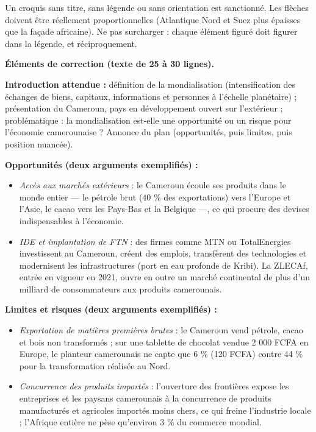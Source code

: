 \documentclass[11pt]{article}
\newcommand{\cle}[1]{{\popxbold\color{popdark}#1}}
\begin{document}
\begin{attention}
Un croquis sans titre, sans légende ou sans orientation est sanctionné. Les flèches doivent être réellement proportionnelles (Atlantique Nord et Suez plus épaisses que la façade africaine). Ne pas surcharger : chaque élément figuré doit figurer dans la légende, et réciproquement.
\end{attention}

\begin{corrige}
\textbf{Éléments de correction (texte de 25 à 30 lignes).}

\textbf{Introduction attendue :} définition de la mondialisation (intensification des échanges de biens, capitaux, informations et personnes à l'échelle planétaire) ; présentation du Cameroun, pays en développement ouvert sur l'extérieur ; problématique : la mondialisation est-elle une opportunité ou un risque pour l'économie camerounaise ? Annonce du plan (opportunités, puis limites, puis position nuancée).

\textbf{Opportunités (deux arguments exemplifiés) :}
\begin{itemize}
\item \emph{Accès aux marchés extérieurs} : le Cameroun écoule ses produits dans le monde entier — le pétrole brut (40 \% des exportations) vers l'Europe et l'Asie, le cacao vers les Pays-Bas et la Belgique —, ce qui procure des devises indispensables à l'économie.
\item \emph{IDE et implantation de FTN} : des firmes comme MTN ou TotalEnergies investissent au Cameroun, créent des emplois, transfèrent des technologies et modernisent les infrastructures (port en eau profonde de Kribi). La \cle{ZLECAf}, entrée en vigueur en 2021, ouvre en outre un marché continental de plus d'un milliard de consommateurs aux produits camerounais.
\end{itemize}

\textbf{Limites et risques (deux arguments exemplifiés) :}
\begin{itemize}
\item \emph{Exportation de matières premières brutes} : le Cameroun vend pétrole, cacao et bois non transformés ; sur une tablette de chocolat vendue 2 000 FCFA en Europe, le planteur camerounais ne capte que 6 \% (120 FCFA) contre 44 \% pour la transformation réalisée au Nord.
\item \emph{Concurrence des produits importés} : l'ouverture des frontières expose les entreprises et les paysans camerounais à la concurrence de produits manufacturés et agricoles importés moins chers, ce qui freine l'industrie locale ; l'Afrique entière ne pèse qu'environ 3 \% du commerce mondial.
\end{itemize}


\end{corrige}
\end{document}
